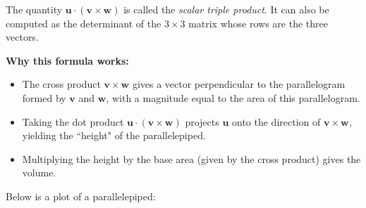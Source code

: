 \noindent The quantity \( \mathbf{u} \cdot (\mathbf{v} \times \mathbf{w}) \) is called the \textit{scalar triple product}. It can also be computed as the determinant of the \( 3 \times 3 \) matrix whose rows are the three vectors.

\noindent \textbf{Why this formula works:}
\begin{itemize}
    \item The cross product \( \mathbf{v} \times \mathbf{w} \) gives a vector perpendicular to the parallelogram formed by \( \mathbf{v} \) and \( \mathbf{w} \), with a magnitude equal to the area of this parallelogram.
    \item Taking the dot product \( \mathbf{u} \cdot (\mathbf{v} \times \mathbf{w}) \) projects \( \mathbf{u} \) onto the direction of \( \mathbf{v} \times \mathbf{w} \), yielding the ``height" of the parallelepiped.
    \item Multiplying the height by the base area (given by the cross product) gives the volume.
\end{itemize}

Below is a plot of a parallelepiped:




